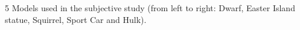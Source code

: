 5 Models used in the subjective study (from left to right: Dwarf, Easter Island statue, Squirrel, Sport Car and Hulk).